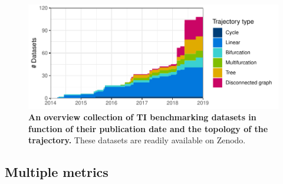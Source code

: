 \begin{figure}[htb!]
	\centering
	\includegraphics[width=.75\linewidth]{fig/datasets.pdf} 
	\caption{\textbf{An overview collection of TI benchmarking datasets in function of their publication date and the topology of the trajectory.} These datasets are readily available on Zenodo\cite{cannoodt_singlecellomicsdatasets_2018}.}
	\label{fig:datasets}
\end{figure}


\subsection{Multiple metrics}


%
%
%

